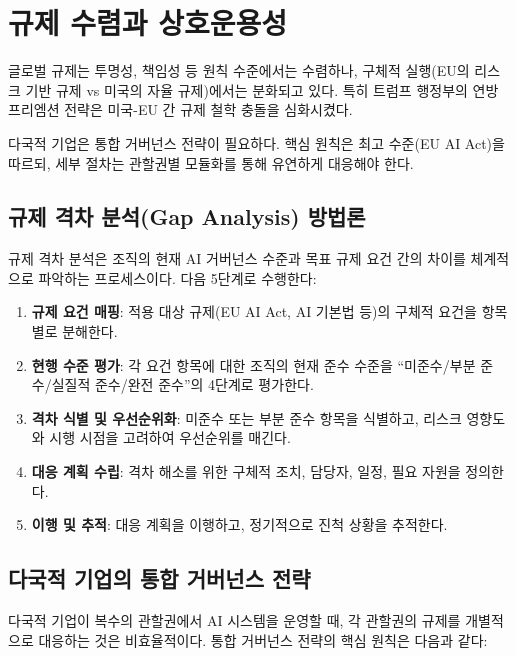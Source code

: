 \section{규제 수렴과 상호운용성}
글로벌 규제는 투명성, 책임성 등 원칙 수준에서는 수렴하나\cite{hagendorff2020ethics, whittlestone2019role}, 구체적 실행(EU의 리스크 기반 규제 vs 미국의 자율 규제)에서는 분화되고 있다. 특히 트럼프 행정부의 연방 프리엠션 전략은 미국-EU 간 규제 철학 충돌을 심화시켰다.

다국적 기업은 통합 거버넌스 전략이 필요하다. 핵심 원칙은 최고 수준(EU AI Act)을 따르되, 세부 절차는 관할권별 모듈화를 통해 유연하게 대응해야 한다.

\subsection{규제 격차 분석(Gap Analysis) 방법론}

규제 격차 분석은 조직의 현재 AI 거버넌스 수준과 목표 규제 요건 간의 차이를 체계적으로 파악하는 프로세스이다. 다음 5단계로 수행한다:

\begin{enumerate}
 \item \textbf{규제 요건 매핑}: 적용 대상 규제(EU AI Act, AI 기본법 등)의 구체적 요건을 항목별로 분해한다.
 \item \textbf{현행 수준 평가}: 각 요건 항목에 대한 조직의 현재 준수 수준을 ``미준수/부분 준수/실질적 준수/완전 준수''의 4단계로 평가한다.
 \item \textbf{격차 식별 및 우선순위화}: 미준수 또는 부분 준수 항목을 식별하고, 리스크 영향도와 시행 시점을 고려하여 우선순위를 매긴다.
 \item \textbf{대응 계획 수립}: 격차 해소를 위한 구체적 조치, 담당자, 일정, 필요 자원을 정의한다.
 \item \textbf{이행 및 추적}: 대응 계획을 이행하고, 정기적으로 진척 상황을 추적한다.
\end{enumerate}

\subsection{다국적 기업의 통합 거버넌스 전략}

다국적 기업이 복수의 관할권에서 AI 시스템을 운영할 때, 각 관할권의 규제를 개별적으로 대응하는 것은 비효율적이다. 통합 거버넌스 전략의 핵심 원칙은 다음과 같다:

